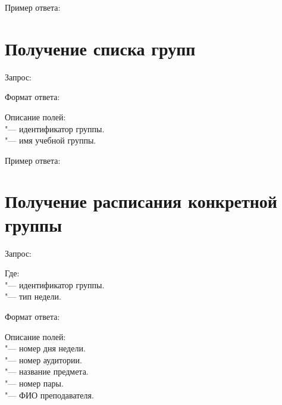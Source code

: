 Пример ответа:
\begin{listing}[H]
\end{listing}
\vspace{-0.75cm}

\section{Получение списка групп}
\label{sec:groups}

Запрос: 

Формат ответа:
\begin{listing}[H]
\end{listing}
\vspace{-0.75cm}

Описание полей:\\
 "--- идентификатор группы.\\
 "--- имя учебной группы.

Пример ответа:
\begin{listing}[H]
\end{listing}
\vspace{-0.75cm}

\section{Получение расписания конкретной группы}
\label{sec:group}

Запрос: 

Где:\\
 "--- идентификатор группы.\\
 "--- тип недели.

Формат ответа:
\begin{listing}[H]
\end{listing}
\vspace{-0.75cm}

Описание полей:\\
 "--- номер дня недели.\\
 "--- номер аудитории.\\
 "--- название предмета.\\
 "--- номер пары.\\
 "--- ФИО преподавателя.

